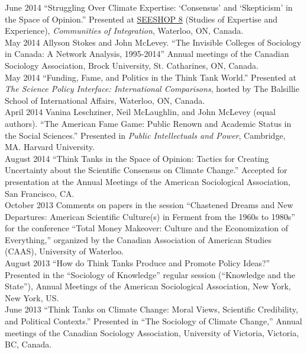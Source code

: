 \documentclass[9pt,usenames,dvipsnames]{article}
\begin{document}
\ind June 2014 ``Struggling Over Climate Expertise: `Consensus' and `Skepticism' in the Space of Opinion.'' Presented at \href{http://www.cf.ac.uk/socsi/contactsandpeople/harrycollins/expertise-project/seeshophome.html}{SEESHOP 8} (Studies of Expertise and Experience), \emph{Communities of Integration}, Waterloo, ON, Canada. \\

\ind May 2014 Allyson Stokes and John McLevey. ``The Invisible Colleges of Sociology in Canada: A Network Analysis, 1995-2014'' Annual meetings of the Canadian Sociology Association, Brock University, St. Catharines, ON, Canada.\\

\ind May 2014 ``Funding, Fame, and Politics in the Think Tank World.'' Presented at \emph{The Science Policy Interface: International Comparisons}, hosted by The Balsillie School of International Affairs, Waterloo, ON, Canada. \\

\ind April 2014 Vanina Leschziner, Neil McLaughlin, and John McLevey (equal authors). ``The American Fame Game: Public Renown and Academic Status in the Social Sciences.'' Presented in \emph{Public Intellectuals and Power}, Cambridge, MA. Harvard University. \\

\ind August 2014 ``Think Tanks in the Space of Opinion: Tactics for Creating Uncertainty about the Scientific Consensus on Climate Change.'' Accepted for presentation at the Annual Meetings of the American Sociological Association, San Francisco, CA. \\

\ind October 2013 Comments on papers in the session ``Chastened Dreams and New Departures: American Scientific Culture(s) in Ferment from the 1960s to 1980s'' for the conference ``Total Money Makeover: Culture and the Economization of Everything,'' organized by the Canadian Association of American Studies (CAAS), University of Waterloo. \\

\ind August 2013 ``How do Think Tanks Produce and Promote Policy Ideas?'' Presented in the ``Sociology of Knowledge'' regular session (``Knowledge and the State''), Annual Meetings of the American Sociological Association, New York, New York, US. \\

\ind June 2013 ``Think Tanks on Climate Change: Moral Views, Scientific Credibility, and Political Contexts.'' Presented in ``The Sociology of Climate Change,'' Annual meetings of the Canadian Sociology Association, University of Victoria, Victoria, BC, Canada. \\
\end{document}
